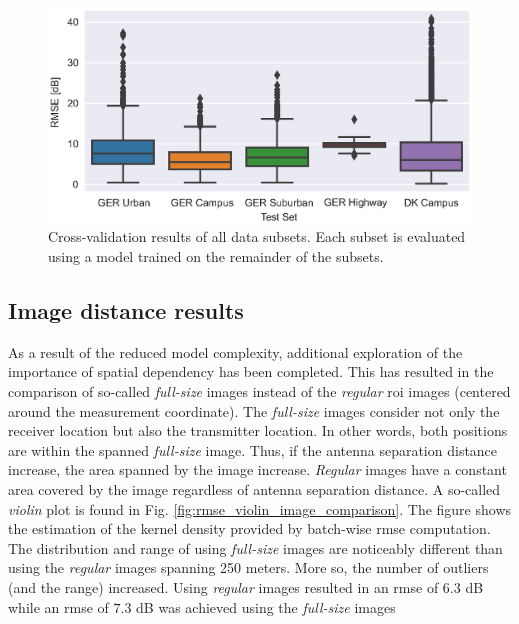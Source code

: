 \begin{figure}[h]
    \centering
    \includegraphics{chapters/part_pathloss/osm_images_paper/figures/RMSE_boxplot.eps}
    \caption{Cross-validation results of all data subsets. Each subset is evaluated using a model trained on the remainder of the subsets.}
    \label{fig:rmse_boxplot_osm}
\end{figure}

\subsection{Image distance results}
As a result of the reduced model complexity, additional exploration of the importance of spatial dependency has been completed. This has resulted in the comparison of so-called \emph{full-size} images instead of the \emph{regular} \gls{roi} images (centered around the measurement coordinate). The \emph{full-size} images consider not only the receiver location but also the transmitter location. In other words, both positions are within the spanned \emph{full-size} image. Thus, if the antenna separation distance increase, the area spanned by the image increase.  \emph{Regular} images have a constant area covered by the image regardless of antenna separation distance. A so-called \emph{violin} plot is found in Fig. \ref{fig:rmse_violin_image_comparison}. The figure shows the estimation of the kernel density provided by batch-wise \gls{rmse} computation. The distribution and range of using \emph{full-size} images are noticeably different than using the \emph{regular} images spanning 250 meters. More so, the number of outliers (and the range) increased. Using \emph{regular} images resulted in an \gls{rmse} of $6.3$ dB while an \gls{rmse} of $7.3$ dB was achieved using the \emph{full-size} images



